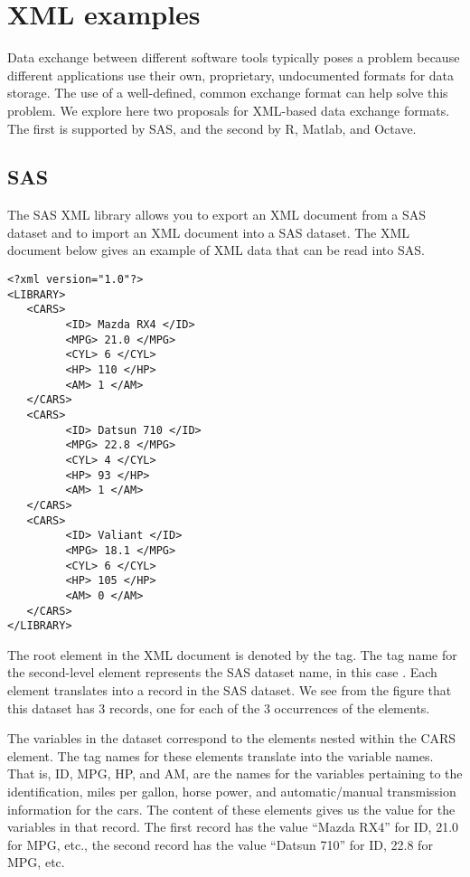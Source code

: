 \section{XML examples}
Data exchange between different software tools typically poses
a problem because different applications use their own, 
proprietary, undocumented formats for data storage. 
The use of a well-defined, common exchange format can help solve 
this problem.
We explore here two proposals for XML-based data exchange formats.
The first is supported by SAS, and the second by R, Matlab, and Octave.

\subsection{SAS}\label{sec:XMLSAS}
The SAS XML library allows you to export an XML document from a SAS 
dataset and to import an XML document into a SAS dataset. 
The XML document below gives an example of XML
data that can be read into SAS.

\begin{verbatim}
<?xml version="1.0"?>
<LIBRARY>  
   <CARS> 
         <ID> Mazda RX4 </ID>
         <MPG> 21.0 </MPG>
         <CYL> 6 </CYL>
         <HP> 110 </HP>
         <AM> 1 </AM>
   </CARS>
   <CARS>  
         <ID> Datsun 710 </ID>
         <MPG> 22.8 </MPG>
         <CYL> 4 </CYL>
         <HP> 93 </HP>
         <AM> 1 </AM>
   </CARS>
   <CARS> 
         <ID> Valiant </ID>
         <MPG> 18.1 </MPG>
         <CYL> 6 </CYL>
         <HP> 105 </HP>
         <AM> 0 </AM>
   </CARS>
</LIBRARY>
\end{verbatim}

The root element in the XML document is denoted by the  tag.
The tag name for the second-level element represents the
SAS dataset name,
in this case .
Each  element translates into a record in the SAS dataset.  
We see from the figure that this dataset has 3 records,
one for each of the 3 occurrences of the  elements.

The variables in the dataset correspond to the 
elements nested within the CARS element. 
The tag names for these elements translate into the variable names. 
That is, ID, MPG, HP, and AM, are the names for 
the variables pertaining to the identification,
miles per gallon, horse power, and automatic/manual transmission
information for the cars.
The content of these elements gives us the value for the
variables in that record.
The first record has the value ``Mazda RX4'' for ID,
21.0 for MPG, etc., 
the second record has the value ``Datsun 710'' for ID,
22.8 for MPG, etc.


